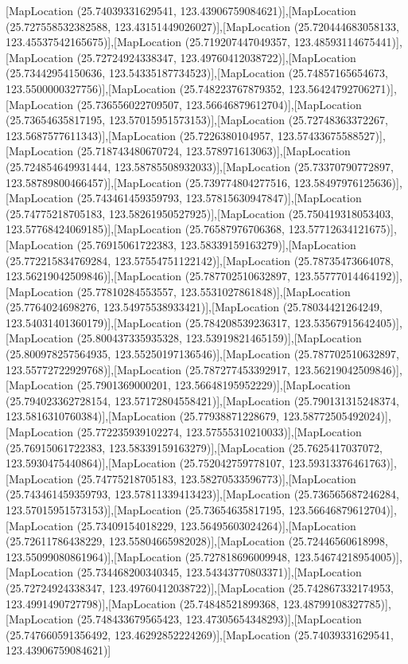 [MapLocation (25.74039331629541, 123.43906759084621)],[MapLocation (25.727558532382588, 123.43151449026027)],[MapLocation (25.720444683058133, 123.45537542165675)],[MapLocation (25.719207447049357, 123.48593114675441)],[MapLocation (25.72724924338347, 123.49760412038722)],[MapLocation (25.73442954150636, 123.54335187734523)],[MapLocation (25.74857165654673, 123.5500000327756)],[MapLocation (25.748223767879352, 123.56424792706271)],[MapLocation (25.736556022709507, 123.56646879612704)],[MapLocation (25.73654635817195, 123.57015951573153)],[MapLocation (25.72748363372267, 123.5687577611343)],[MapLocation (25.7226380104957, 123.57433675588527)],[MapLocation (25.718743480670724, 123.578971613063)],[MapLocation (25.724854649931444, 123.58785508932033)],[MapLocation (25.73370790772897, 123.58789800466457)],[MapLocation (25.739774804277516, 123.58497976125636)],[MapLocation (25.743461459359793, 123.57815630947847)],[MapLocation (25.74775218705183, 123.58261950527925)],[MapLocation (25.750419318053403, 123.57768424069185)],[MapLocation (25.76587976706368, 123.57712634121675)],[MapLocation (25.76915061722383, 123.58339159163279)],[MapLocation (25.772215834769284, 123.57554751122142)],[MapLocation (25.78735473664078, 123.56219042509846)],[MapLocation (25.787702510632897, 123.55777014464192)],[MapLocation (25.77810284553557, 123.5531027861848)],[MapLocation (25.7764024698276, 123.54975538933421)],[MapLocation (25.78034421264249, 123.54031401360179)],[MapLocation (25.784208539236317, 123.53567915642405)],[MapLocation (25.800437335935328, 123.53919821465159)],[MapLocation (25.800978257564935, 123.55250197136546)],[MapLocation (25.787702510632897, 123.55772722929768)],[MapLocation (25.787277453392917, 123.56219042509846)],[MapLocation (25.7901369000201, 123.56648195952229)],[MapLocation (25.794023362728154, 123.57172804558421)],[MapLocation (25.790131315248374, 123.5816310760384)],[MapLocation (25.77938871228679, 123.58772505492024)],[MapLocation (25.772235939102274, 123.57555310210033)],[MapLocation (25.76915061722383, 123.58339159163279)],[MapLocation (25.7625417037072, 123.5930475440864)],[MapLocation (25.752042759778107, 123.59313376461763)],[MapLocation (25.74775218705183, 123.58270533596773)],[MapLocation (25.743461459359793, 123.57811339413423)],[MapLocation (25.736565687246284, 123.57015951573153)],[MapLocation (25.73654635817195, 123.56646879612704)],[MapLocation (25.73409154018229, 123.56495603024264)],[MapLocation (25.72611786438229, 123.55804665982028)],[MapLocation (25.72446560618998, 123.55099080861964)],[MapLocation (25.727818696009948, 123.54674218954005)],[MapLocation (25.734468200340345, 123.54343770803371)],[MapLocation (25.72724924338347, 123.49760412038722)],[MapLocation (25.742867332174953, 123.4991490727798)],[MapLocation (25.74848521899368, 123.48799108327785)],[MapLocation (25.748433679565423, 123.47305654348293)],[MapLocation (25.747660591356492, 123.46292852224269)],[MapLocation (25.74039331629541, 123.43906759084621)]